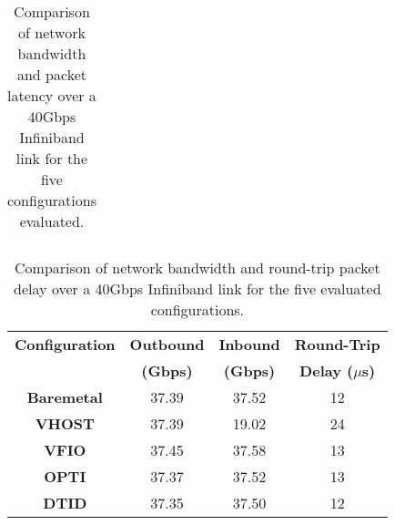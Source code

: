 {\begin{table}[tbp]
\begin{tabular}{|l|l|l|l|}
\end{tabular}
\caption{Comparison of network bandwidth and packet latency over a
40Gbps Infiniband link for the five configurations evaluated.}
\label{tab:network_performance}
\end{table}
}

\begin{table}
\renewcommand{\arraystretch}{1.2}
\small
\begin{center}
\begin{tabular}{|c|c|c|c|} \hline
{\bf Configuration} & {\bf Outbound} & {\bf Inbound}  & {\bf Round-Trip} \\ 
 & {\bf (Gbps)} & {\bf (Gbps)} & {\bf Delay ($\mu$s)} \\ \hline
 {\bf Baremetal}  & 37.39 & 37.52 & 12\\ \hline
 {\bf VHOST} & 37.39 & 19.02 & 24\\ \hline
{\bf VFIO}  & 37.45 & 37.58 & 13\\ \hline
 {\bf OPTI} & 37.37 & 37.52 & 13\\ \hline
 {\bf DTID} & 37.35 & 37.50 & 12\\ \hline
\end{tabular}
\end{center}
\caption{Comparison of network bandwidth and round-trip packet delay over a
40Gbps Infiniband link for the five evaluated configurations.}
\label{tab:network_performance}
\vspace{-0.06in}
\end{table}


